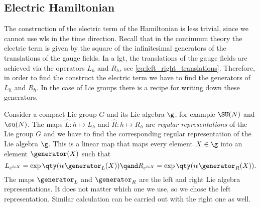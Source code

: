\subsection{Electric Hamiltonian}
\label{sub:electric_hamiltonian}

The construction of the electric term of the Hamiltonian is less trivial, since we cannot use \ac{wl}s in the time direction.
Recall that in the continuum theory the electric term is given by the square of the infinitesimal generators of the translations of the gauge fields.
In a \ac{lgt}, the translations of the gauge fields are achieved via the operators $L_h$ and $R_h$, see \eqref{eq:left_right_translations}.
Therefore, in order to find the construct the electric term we have to find the generators of $L_h$ and $R_h$.
In the case of Lie groups there is a recipe for writing down these generators.

Consider a compact Lie group $G$ and its Lie algebra $\g$, for example $\SU(N)$ and $\su(N)$.
The maps $\hat{L}: h \mapsto L_h$ and $\hat{R}: h \mapsto R_h$ are \emph{regular representations} of the Lie group $G$ and we have to find the corresponding regular representation of the Lie algebra $\g$.
This is a linear map that maps every element $X \in \g$ into an element $\generator(X)$ such that
\begin{equation}
    L_{e^{i \epsilon X}} = \exp \qty(i \epsilon \generator_L(X))
    \qand
    R_{e^{i \epsilon X}} = \exp \qty(i \epsilon \generator_R(X)).
\end{equation}
The maps $\generator_L$ and $\generator_R$ are the left and right Lie algebra representations.
It does not matter which one we use, so we chose the left representation.
Similar calculation can be carried out with the right one as well.

